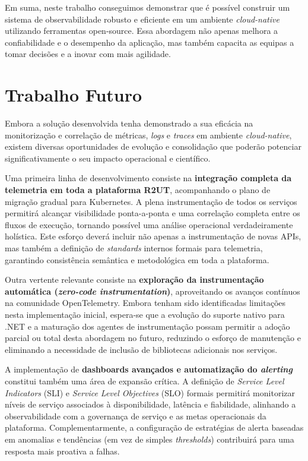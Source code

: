 Em suma, neste trabalho conseguimos demonstrar que é possível construir um sistema de observabilidade robusto e eficiente em um ambiente \textit{cloud-native} utilizando ferramentas open-source. Essa abordagem não apenas melhora a confiabilidade e o desempenho da aplicação, mas também capacita as equipas a tomar decisões e a inovar com mais agilidade.



\section{Trabalho Futuro}

Embora a solução desenvolvida tenha demonstrado a sua eficácia na monitorização e correlação de métricas, \textit{logs} e \textit{traces} em ambiente \textit{cloud-native}, existem diversas oportunidades de evolução e consolidação que poderão potenciar significativamente o seu impacto operacional e científico.

Uma primeira linha de desenvolvimento consiste na \textbf{integração completa da telemetria em toda a plataforma R2UT}, acompanhando o plano de migração gradual para Kubernetes. A plena instrumentação de todos os serviços permitirá alcançar visibilidade ponta-a-ponta e uma correlação completa entre os fluxos de execução, tornando possível uma análise operacional verdadeiramente holística. Este esforço deverá incluir não apenas a instrumentação de novas APIs, mas também a definição de \textit{standards} internos formais para telemetria, garantindo consistência semântica e metodológica em toda a plataforma.

Outra vertente relevante consiste na \textbf{exploração da instrumentação automática (\textit{zero-code instrumentation})}, aproveitando os avanços contínuos na comunidade OpenTelemetry. Embora tenham sido identificadas limitações nesta implementação inicial, espera-se que a evolução do suporte nativo para .NET e a maturação dos agentes de instrumentação possam permitir a adoção parcial ou total desta abordagem no futuro, reduzindo o esforço de manutenção e eliminando a necessidade de inclusão de bibliotecas adicionais nos serviços.

A implementação de \textbf{dashboards avançados e automatização do \textit{alerting}} constitui também uma área de expansão crítica. A definição de \textit{Service Level Indicators} (SLI) e \textit{Service Level Objectives} (SLO) formais permitirá monitorizar níveis de serviço associados à disponibilidade, latência e fiabilidade, alinhando a observabilidade com a governança de serviço e as metas operacionais da plataforma. Complementarmente, a configuração de estratégias de alerta baseadas em anomalias e tendências (em vez de simples \textit{thresholds}) contribuirá para uma resposta mais proativa a falhas.

